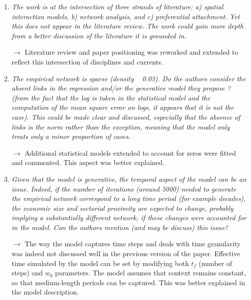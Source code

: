 \documentclass[10pt,a4paper,sans]{moderncv}
\begin{document}

\begin{enumerate}

	\item \textit{The work is at the intersection of three strands of literature: a) spatial interaction models, b) network analysis, and c) preferential attachment. Yet this does not appear in the literature review. The work could gain more depth from a better discussion of the literature it is grounded in.}
	
	$\rightarrow$ Literature review and paper positioning was reworked and extended to reflect this intersection of disciplines and currents.
	
	\medskip


	\item \textit{The empirical network is sparse (density ~ 0.03). Do the authors consider the absent links in the regression and/or the generative model they propose ? (from the fact that the log is taken in the statistical model and the computation of the mean square error on logs, it appears that it is not the case). This could be made clear and discussed, especially that the absence of links is the norm rather than the exception, meaning that the model only treats only a minor proportion of cases.}
	
	$\rightarrow$ Additional statistical models extended to account for zeros were fitted and commented. This aspect was better explained.
	
	\medskip


	\item \textit{Given that the model is generative, the temporal aspect of the model can be an issue. Indeed, if the number of iterations (around 5000) needed to generate the empirical network correspond to a long time period (for example decades), the economic size and sectorial proximity are expected to change, probably implying a substantially different network, if these changes were accounted for in the model. Can the authors mention (and may be discuss) this issue?}
	
	$\rightarrow$ The way the model captures time steps and deals with time granularity was indeed not discussed well in the previous version of the paper. Effective time simulated by the model can be set by modifying both $t_f$ (number of steps) and $w_0$ parameters. The model assumes that context remains constant, so that medium-length periods can be captured. This was better explained in the model description.


\end{enumerate}
\end{document}
